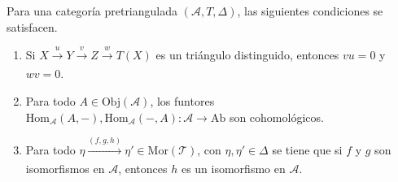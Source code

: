 \documentclass[tesis]{subfiles}
\begin{document}
\begin{Teo}\label{Mendoza_CT-1.2}
    Para una categoría pretriangulada $(\mathscr{A},T,\Delta)$, las siguientes condiciones se satisfacen.

    \begin{enumerate}[label=(\alph*)]
    
        \item Si $X\xrightarrow[]{u}Y\xrightarrow[]{v}Z\xrightarrow[]{w}T(X)$ es un triángulo distinguido, entonces $vu=0$ y $wv=0$.

        \item Para todo $A\in\text{Obj}(\mathscr{A})$, los funtores $\text{Hom}_\mathscr{A}(A,-), \text{Hom}_\mathscr{A}(-,A):\mathscr{A}\to \text{Ab}$ son cohomológicos.

        \item Para todo $\eta\xrightarrow[]{(f,g,h)}\eta'\in\text{Mor}(\mathscr{T})$, con $\eta,\eta'\in\Delta$ se tiene que si $f$ y $g$ son isomorfismos en $\mathscr{A}$, entonces $h$ es un isomorfismo en $\mathscr{A}$.
    \end{enumerate}
\end{Teo}
\end{document}
